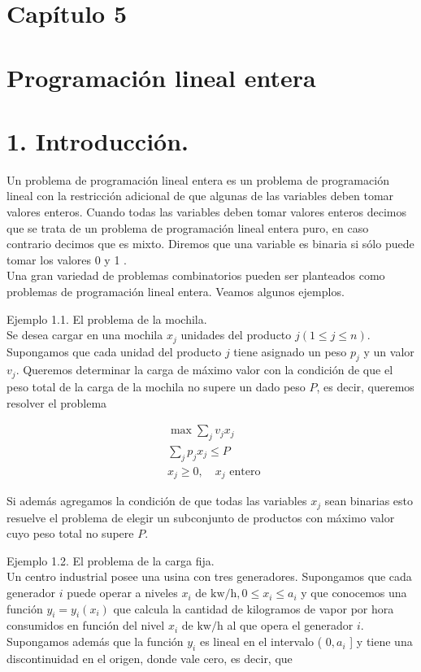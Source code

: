 \documentclass[10pt]{article}
\begin{document}
\section*{Capítulo 5}
\section*{Programación lineal entera}
\section*{1. Introducción.}
Un problema de programación lineal entera es un problema de programación lineal con la restricción adicional de que algunas de las variables deben tomar valores enteros. Cuando todas las variables deben tomar valores enteros decimos que se trata de un problema de programación lineal entera puro, en caso contrario decimos que es mixto. Diremos que una variable es binaria si sólo puede tomar los valores 0 y 1 .\\
Una gran variedad de problemas combinatorios pueden ser planteados como problemas de programación lineal entera. Veamos algunos ejemplos.

Ejemplo 1.1. El problema de la mochila.\\
Se desea cargar en una mochila $x_{j}$ unidades del producto $j(1 \leq j \leq n)$. Supongamos que cada unidad del producto $j$ tiene asignado un peso $p_{j}$ y un valor $v_{j}$. Queremos determinar la carga de máximo valor con la condición de que el peso total de la carga de la mochila no supere un dado peso $P$, es decir, queremos resolver el problema

$$
\begin{aligned}
& \max \sum_{j} v_{j} x_{j} \\
& \sum_{j} p_{j} x_{j} \leq P \\
& x_{j} \geq 0, \quad x_{j} \text { entero }
\end{aligned}
$$

Si además agregamos la condición de que todas las variables $x_{j}$ sean binarias esto resuelve el problema de elegir un subconjunto de productos con máximo valor cuyo peso total no supere $P$.

Ejemplo 1.2. El problema de la carga fija.\\
Un centro industrial posee una usina con tres generadores. Supongamos que cada generador $i$ puede operar a niveles $x_{i}$ de $\mathrm{kw} / \mathrm{h}, 0 \leq x_{i} \leq a_{i}$ y que conocemos una función $y_{i}=y_{i}\left(x_{i}\right)$ que calcula la cantidad de kilogramos de vapor por hora consumidos en función del nivel $x_{i}$ de $\mathrm{kw} / \mathrm{h}$ al que opera el generador $i$. Supongamos además que la función $y_{i}$ es lineal en el intervalo ( $0, a_{i}$ ] y tiene una discontinuidad en el origen, donde vale cero, es decir, que
\end{document}
